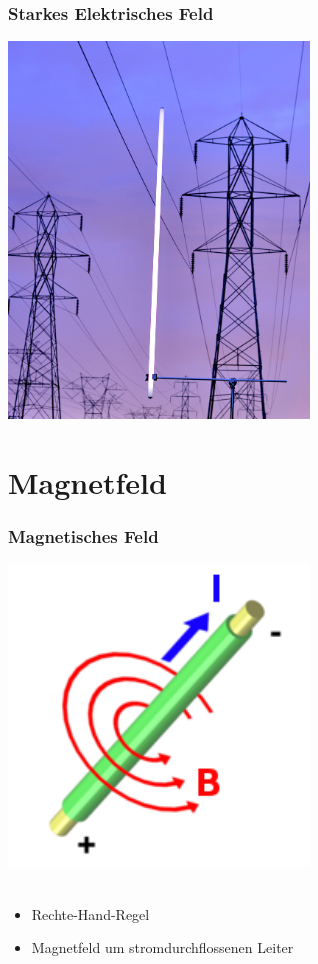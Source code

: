\begin{frame}
    \frametitle{Starkes Elektrisches Feld}
    \begin{center}
        \includegraphics[width=0.6\textwidth,height=.85\textheight,keepaspectratio]{a08/Fluorescent_tube_under_electric_line.jpg}
	{\tiny \hyperlink{refs}{\cite{wm}}}
    \end{center}
\end{frame}

\section*{Magnetfeld}

\begin{frame}
    \frametitle{Magnetisches Feld}
    \begin{center}
		\includegraphics[width=0.6\textwidth,height=.6\textheight,keepaspectratio]{a08/RechteHand.png}\\
		{\tiny \hyperlink{refs}{\cite{wm}}} \\[1em]
		\begin{itemize}
			\item Rechte-Hand-Regel
			\item Magnetfeld um stromdurchflossenen Leiter
		\end{itemize}
	\end{center}
\end{frame}

